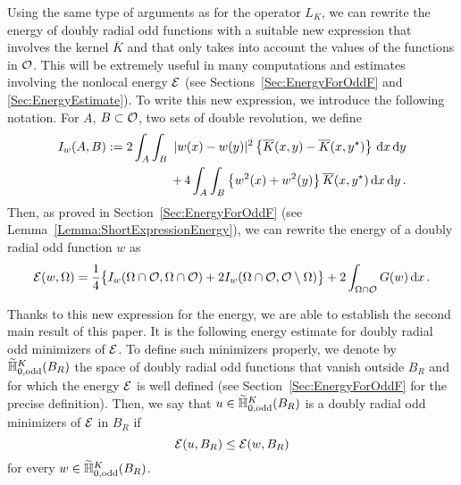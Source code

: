 Using the same type of arguments as for the operator $L_K$, we can rewrite the energy of doubly radial odd functions with a suitable new expression that involves the kernel $\overline{K}$ and that only takes into account the values of the functions in $\mathcal{O}$. This will be extremely useful in many computations and estimates involving the nonlocal energy $\mathcal{E}$ (see Sections~\ref{Sec:EnergyForOddF} and \ref{Sec:EnergyEstimate}). To write this new expression, we introduce the following notation.  For $A$, $B\subset \mathcal{O}$, two sets of double revolution, we define
\begin{equation*}
\begin{split}
I_w(A,B) := 2\int_A  \int_B  \ |w(x)-w(y)|^2 \left\{ \overline{K}(x,y) - \overline{K}(x,y^\star) \right\} \,\mathrm{d} x \,\mathrm{d} y  \\
+\, 4 \int_A  \int_B  \left\{w^2(x)+w^2(y)\right\} \overline{K}(x,y^\star) \,\mathrm{d} x \,\mathrm{d} y\,.
\end{split}
\end{equation*}
Then, as proved in Section~\ref{Sec:EnergyForOddF} (see Lemma~\ref{Lemma:ShortExpressionEnergy}), we can rewrite the energy of a doubly radial odd function $w$ as
\begin{equation}
\label{Eq:ShortExpressionEnergyIntro}
\mathcal{E}(w, \Omega) = \frac{1}{4} \big \{I_w(\Omega\cap\mathcal{O},\Omega\cap\mathcal{O}) +  2I_w(\Omega\cap\mathcal{O},\mathcal{O}\setminus\Omega) \big \} + 2\int_{\Omega\cap \mathcal{O}} G(w) \,\mathrm{d} x \,.
\end{equation}



Thanks to this new expression for the energy, we are able to establish the second main result of this paper. It is the following energy estimate for doubly radial odd minimizers of $\mathcal{E}$. To define such minimizers properly, we denote by $\widetilde{\mathbb{H}}^K_{0, \mathrm{odd}}(B_R)$ the space of doubly radial odd functions that vanish outside $B_R$ and for which the energy $\mathcal{E}$ is well defined (see Section~\ref{Sec:EnergyForOddF} for the precise definition). Then, we say that $u\in \widetilde{\mathbb{H}}^K_{0, \mathrm{odd}}(B_R)$ is a doubly radial odd minimizers of $\mathcal{E}$ in $B_R$ if
$$
\mathcal{E}(u,B_R) \leq \mathcal{E} (w,B_R)
$$
for every $w\in \widetilde{\mathbb{H}}^K_{0, \mathrm{odd}}(B_R)$. 

